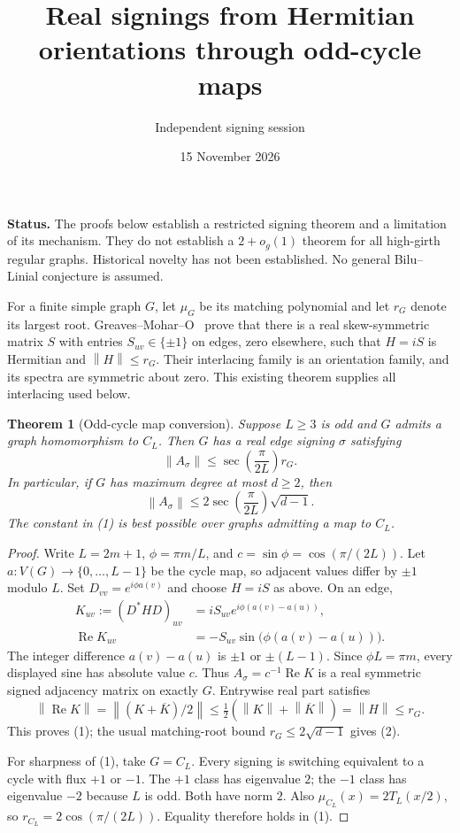 \documentclass[11pt]{article}
\title{Real signings from Hermitian orientations through odd-cycle maps}
\author{Independent signing session}
\date{15 November 2026}
\newtheorem{theorem}{Theorem}
\newcommand{\norm}[1]{\left\lVert #1\right\rVert}
\newcommand{\Real}{\operatorname{Re}}
\begin{document}
\maketitle

\noindent\textbf{Status.} The proofs below establish a restricted signing
theorem and a limitation of its mechanism. They do not establish a
$2+o_g(1)$ theorem for all high-girth regular graphs. Historical novelty
has not been established. No general Bilu--Linial conjecture is assumed.

For a finite simple graph $G$, let $\mu_G$ be its matching polynomial and
let $r_G$ denote its largest root. Greaves--Mohar--O~\cite[Theorem 1.1,
Corollary 1.2]{GMO} prove that there is a real skew-symmetric matrix $S$
with entries $S_{uv}\in\{\pm1\}$ on edges, zero elsewhere, such that
$H=iS$ is Hermitian and $\norm{H}\le r_G$. Their interlacing family is
an orientation family, and its spectra are symmetric about zero.
This existing theorem supplies all interlacing used below.

\begin{theorem}[Odd-cycle map conversion]\label{thm:cycle}
Suppose $L\ge3$ is odd and $G$ admits a graph homomorphism to $C_L$.
Then $G$ has a real edge signing $\sigma$ satisfying
\[
 \norm{A_\sigma}\le \sec\!\left(\frac{\pi}{2L}\right)r_G.
 \tag{1}
\]
In particular, if $G$ has maximum degree at most $d\ge2$, then
\[
 \norm{A_\sigma}\le
 2\sec\!\left(\frac{\pi}{2L}\right)\sqrt{d-1}.
 \tag{2}
\]
The constant in (1) is best possible over graphs admitting a map to $C_L$.
\end{theorem}
\begin{proof}
Write $L=2m+1$, $\phi=\pi m/L$, and
$c=\sin\phi=\cos(\pi/(2L))$. Let $a:V(G)\to\{0,\ldots,L-1\}$
be the cycle map, so adjacent values differ by $\pm1$ modulo $L$.
Set $D_{vv}=e^{i\phi a(v)}$ and choose $H=iS$ as above. On an edge,
\begin{align*}
 K_{uv}:=(D^*HD)_{uv}&=iS_{uv}e^{i\phi(a(v)-a(u))},\\
 \Real K_{uv}&=-S_{uv}\sin\bigl(\phi(a(v)-a(u))\bigr).
\end{align*}
The integer difference $a(v)-a(u)$ is $\pm1$ or $\pm(L-1)$.
Since $\phi L=\pi m$, every displayed sine has absolute value $c$.
Thus $A_\sigma=c^{-1}\Real K$ is a real symmetric signed adjacency
matrix on exactly $G$. Entrywise real part satisfies
\[
 \norm{\Real K}
 =\norm{(K+\overline K)/2}
 \le\tfrac12(\norm K+\norm{\overline K})=\norm H\le r_G.
\]
This proves (1); the usual matching-root bound
$r_G\le2\sqrt{d-1}$ gives (2).

For sharpness of (1), take $G=C_L$. Every signing is switching equivalent
to a cycle with flux $+1$ or $-1$. The $+1$ class has eigenvalue $2$;
the $-1$ class has eigenvalue $-2$ because $L$ is odd. Both have norm $2$.
Also $\mu_{C_L}(x)=2T_L(x/2)$, so
$r_{C_L}=2\cos(\pi/(2L))$. Equality therefore holds in (1).
\end{proof}
\end{document}
